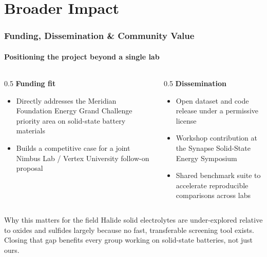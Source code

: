 \section{Broader Impact}

\begin{frame}
\frametitle{Funding, Dissemination \& Community Value}
\framesubtitle{Positioning the project beyond a single lab}

\begin{columns}[T]
\begin{column}{0.5\linewidth}
\textbf{Funding fit}
\begin{itemize}
  \item Directly addresses the Meridian Foundation Energy Grand Challenge priority area on solid-state battery materials
  \item Builds a competitive case for a joint Nimbus Lab / Vertex University follow-on proposal
\end{itemize}
\end{column}
\begin{column}{0.5\linewidth}
\textbf{Dissemination}
\begin{itemize}
  \item Open dataset and code release under a permissive license
  \item Workshop contribution at the Synapse Solid-State Energy Symposium
  \item Shared benchmark suite to accelerate reproducible comparisons across labs
\end{itemize}
\end{column}
\end{columns}

\vspace{0.25cm}
\begin{block}{Why this matters for the field}
\footnotesize Halide solid electrolytes are under-explored relative to oxides and sulfides largely because no fast, transferable screening tool exists. Closing that gap benefits every group working on solid-state batteries, not just ours.
\end{block}
\end{frame}

